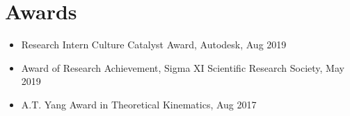 \documentclass[letterpaper,10pt]{article}
\newcommand{\resumeSection}[1]{
\vspace{-12pt}
\section{\textbf{#1}}
}
\newcommand{\resumeItemListStart}{
\vspace{-7pt}
\begin{itemize}[leftmargin=14pt]
}
\newcommand{\resumeItemListEnd}{
\vspace{+7pt}
\end{itemize}
}
\newcommand{\resumeItem}[1]{
  \item\small{
      {#1 \vspace{-7pt}
      }
  }
}
\begin{document}
\resumeSection{Awards}
\vspace{+7pt}
    \resumeItemListStart
    \resumeItem{Research Intern Culture Catalyst Award, Autodesk, Aug 2019}
    \resumeItem{Award of Research Achievement, Sigma XI Scientific Research Society, May 2019}
    \resumeItem{A.T. Yang Award in Theoretical Kinematics, Aug 2017}
    \resumeItemListEnd
\end{document}
